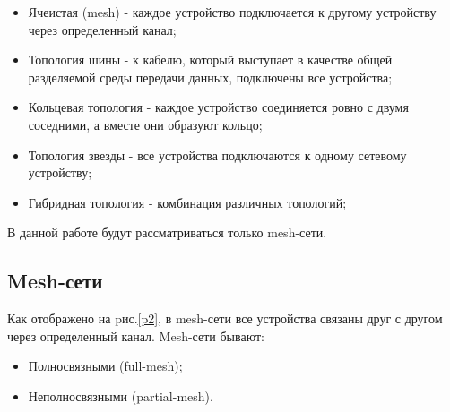 \documentclass[a4paper]{article}
\begin{document}
\begin{itemize}
    \item Ячеистая (mesh) - каждое устройство подключается к другому устройству через определенный канал;
    \item Топология шины - к кабелю, который выступает в качестве общей разделяемой среды передачи данных, подключены все устройства;
    \item Кольцевая топология - каждое устройство соединяется ровно с двумя соседними, а вместе они образуют кольцо;
    \item Топология звезды - все устройства подключаются к одному сетевому устройству;
    \item Гибридная топология - комбинация различных топологий;
\end{itemize}
В данной работе будут рассматриваться только mesh-сети.
\subsection{Mesh-сети}
Как отображено на pис.\ref{p2}, в mesh-сети все устройства связаны друг с другом через определенный канал.
Mesh-сети бывают: 
\begin{itemize}
    \item Полносвязными (full-mesh);
    \item Неполносвязными (partial-mesh).
\end{itemize}
\end{document}
